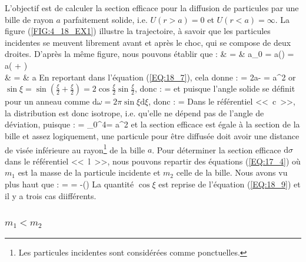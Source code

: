 L'objectif est de calculer la section efficace pour la diffusion de particules par une bille de rayon $a$ parfaitement solide, i.e. $U(r>a) = 0$ et $U(r<a) = \infty$. La figure (\ref{FIG:4_18_EX1}) illustre la trajectoire, \`a savoir que les particules incidentes se meuvent librement avant et apr\`es le choc, qui se compose de deux droites. D'apr\`es la m\^eme figure, nous pouvons \'etablir que :
\bea
	\rho & = & a\sin\varphi_{0} = a\sin\left(\right) = a\left(\cos{}\sin{} + \sin{}\cos{}\right) \nonumber \\
	& = & a\cos{} \nonumber
\eea
En reportant dans l'\'equation (\ref{EQ:18_7}), cela donne :
\benn
	\sigma = 2\pi a\cos{}\times\bigg\lvert -\sin{} \bigg\rvert {}\xi = \pi a^{2}\cos{}\sin{}\xi
\eenn
or $\sin\xi = \sin(\frac{\xi}{2} + \frac{\xi}{2}) = 2\cos\frac{\xi}{2}\sin\frac{\xi}{2}$, donc :
\benn
	\sigma = \sin\xi{}\xi
\eenn
et puisque l'angle solide se d\'efinit pour un anneau comme $\mathrm{d}\omega = 2\pi\sin\xi\mathrm{d}\xi$, donc :
\benn
	\sigma = \omega
\eenn
Dans le r\'ef\'erentiel <<~c~>>, la distribution est donc isotrope, i.e. qu'elle ne d\'epend pas de l'angle de d\'eviation, puisque :
\benn
	\sigma = \int_{0}^{4\pi}\omega = \pi a^{2}
\eenn
et la section efficace est \'egale \`a la section de la bille et assez logiquement, une particule pour \^etre diffus\'ee doit avoir une distance de vis\'ee inf\'erieure au rayon\footnote{Les particules incidentes sont consid\'er\'ees comme ponctuelles.} de la bille $a$. Pour d\'eterminer la section efficace $\mathrm{d}\sigma$ dans le r\'ef\'erentiel <<~l~>>, nous pouvons repartir des \'equations (\ref{EQ:17_4}) o\`u $m_{1}$ est la masse de la particule incidente et $m_{2}$ celle de la bille. Nous avons vu plus haut que :
\benn
	\sigma = \sin\xi{}\xi = -(\cos\xi)
\eenn
La quantit\'e $\cos\xi$ est reprise de l'\'equation (\ref{EQ:18_9}) et il y a trois cas diiff\'erents.

\subsubsection{$m_{1} < m_{2}$}

